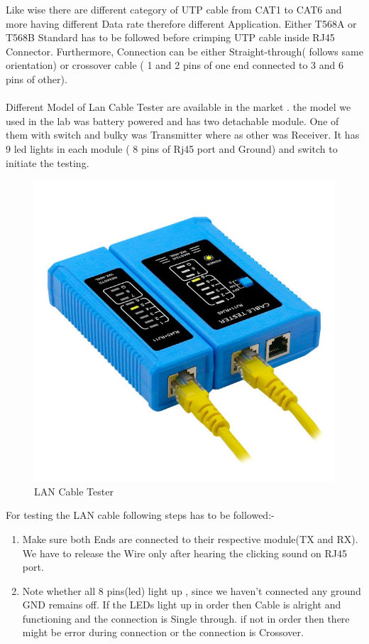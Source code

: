 \documentclass[a4paper,12pt]{article}
\begin{document}
Like wise there are different category of UTP cable  from CAT1 to CAT6 and more 
having different Data rate therefore different Application.
Either T568A or T568B  Standard has to be followed before crimping UTP cable inside RJ45 Connector. Furthermore,
Connection can be either Straight-through( follows same orientation) or crossover cable ( 1 and 2 pins of one end connected to 3 and 6 pins of other).\\\\

Different Model of Lan Cable Tester are available in the market . the model we used in the lab was battery powered 
and has two detachable module. One of them with switch and bulky was Transmitter where as other was Receiver.
It has  9 led lights in each module ( 8 pins of Rj45 port and Ground) and switch to initiate the  testing.

\begin{figure}[H]
    \centering
    \includegraphics[scale=0.6,cframe=blue 0.5pt 3pt]{lantester.jpg} 
    \caption{LAN Cable Tester}
\end{figure}

For testing the LAN cable following steps has to  be followed:-
\begin{enumerate}
    \item Make sure both Ends are connected to their respective module(TX and RX). 
    We have to release the Wire only after hearing the clicking sound on RJ45 port.
    \item Note whether all 8 pins(led) light up , since we haven't connected any ground GND remains off.
     If the LEDs light up in order then Cable is alright and functioning and the connection is Single through.
    if not in order then there might be error during connection or the connection is Crossover.
\end{enumerate}
\end{document}
